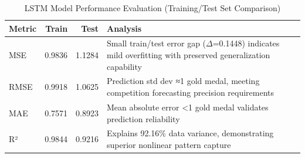 \documentclass{mcmthesis}
\begin{document}
\begin{table}[H]
	\centering
	\caption{LSTM Model Performance Evaluation (Training/Test Set Comparison)}
	\label{tab:model_performance}
	\begin{tabular}{lrrp{8cm}}
		\toprule
		\rowcolor{red!10}
		\textbf{Metric} & \textbf{Train} & \textbf{Test} & \textbf{Analysis} \\
		\midrule
		\rowcolor{gray!10}
		MSE  & 0.9836 & 1.1284 & Small train/test error gap ($\Delta$=0.1448) indicates mild overfitting with preserved generalization capability \\
		RMSE & 0.9918 & 1.0625 & Prediction std dev ≈1 gold medal, meeting competition forecasting precision requirements \\
		\rowcolor{gray!10}
		MAE  & 0.7571 & 0.8923 & Mean absolute error <1 gold medal validates prediction reliability \\
		R²   & 0.9844 & 0.9216 & Explains 92.16\% data variance, demonstrating superior nonlinear pattern capture \\
		\bottomrule
	\end{tabular}
\end{table}
\end{document}
